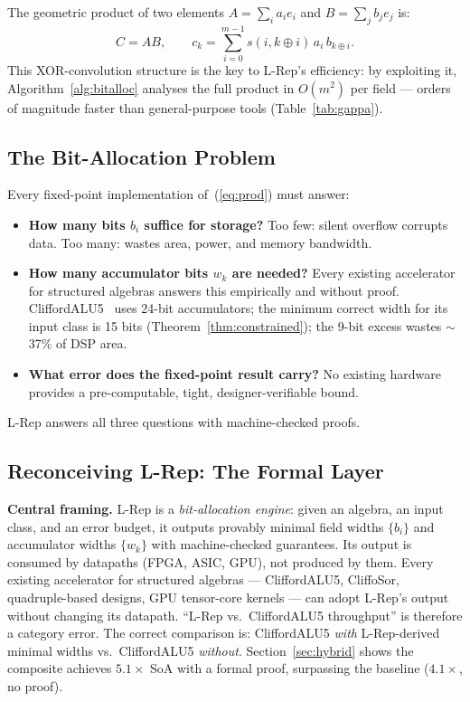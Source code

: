 \documentclass[11pt,a4paper]{article}
\theoremstyle{definition}
\theoremstyle{plain}
\theoremstyle{remark}
\begin{document}
The geometric product of two elements $A=\sum_i a_i e_i$ and
$B=\sum_j b_j e_j$ is:
\begin{equation}\label{eq:prod}
  C = AB, \qquad c_k = \sum_{i=0}^{m-1} s(i,k\oplus i)\,a_i\,b_{k\oplus i}.
\end{equation}
This XOR-convolution structure is the key to L-Rep's efficiency:
by exploiting it, Algorithm~\ref{alg:bitalloc} analyses the full product
in $O(m^2)$ per field --- orders of magnitude faster than general-purpose
tools (Table~\ref{tab:gappa}).

\subsection{The Bit-Allocation Problem}

Every fixed-point implementation of~(\ref{eq:prod}) must answer:
\begin{itemize}
  \item \textbf{How many bits $b_i$ suffice for storage?}
        Too few: silent overflow corrupts data.
        Too many: wastes area, power, and memory bandwidth.
  \item \textbf{How many accumulator bits $w_k$ are needed?}
        Every existing accelerator for structured algebras answers this
        empirically and without proof.
        CliffordALU5~\cite{cliffordalu5} uses 24-bit accumulators;
        the minimum correct width for its input class is 15 bits
        (Theorem~\ref{thm:constrained}); the 9-bit excess wastes
        $\sim$37\% of DSP area.
  \item \textbf{What error does the fixed-point result carry?}
        No existing hardware provides a pre-computable, tight, designer-verifiable bound.
\end{itemize}

L-Rep answers all three questions with machine-checked proofs.

\subsection{Reconceiving L-Rep: The Formal Layer}

\begin{insightbox}
\textbf{Central framing.}
L-Rep is a \emph{bit-allocation engine}: given an algebra, an input
class, and an error budget, it outputs provably minimal field widths
$\{b_i\}$ and accumulator widths $\{w_k\}$ with machine-checked
guarantees.
Its output is consumed by datapaths (FPGA, ASIC, GPU), not produced by them.
Every existing accelerator for structured algebras --- CliffordALU5,
CliffoSor, quadruple-based designs, GPU tensor-core kernels ---
can adopt L-Rep's output without changing its datapath.
``L-Rep vs.\ CliffordALU5 throughput'' is therefore a category error.
The correct comparison is: CliffordALU5 \emph{with} L-Rep-derived
minimal widths vs.\ CliffordALU5 \emph{without}.
Section~\ref{sec:hybrid} shows the composite achieves $5.1\times$ SoA
with a formal proof, surpassing the baseline ($4.1\times$, no proof).
\end{insightbox}
\end{document}
